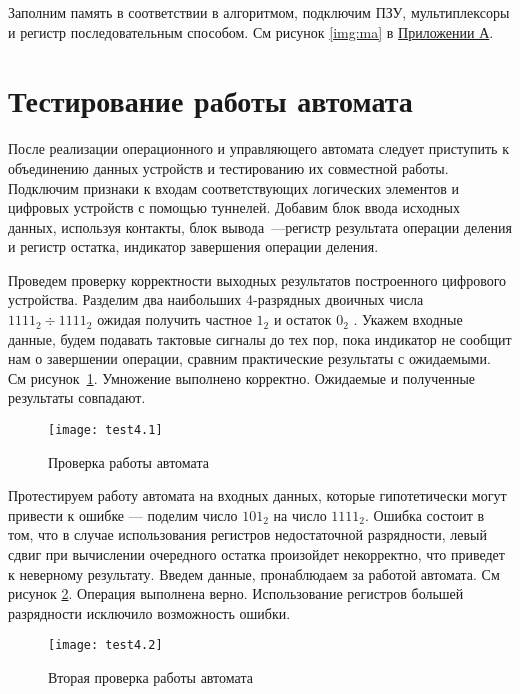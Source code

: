 \documentclass[a4paper,14pt]{extarticle}
\begin{document}
Заполним память в соответствии в алгоритмом, подключим ПЗУ, мультиплексоры и регистр последовательным способом. См рисунок \ref{img:ma} в \hyperref[tam]{Приложении А}.


\section{Тестирование работы автомата}
После реализации операционного и управляющего автомата следует приступить к объединению данных устройств и тестированию их совместной работы. Подключим признаки к входам соответствующих логических элементов и цифровых устройств с помощью туннелей. Добавим блок ввода исходных данных, используя контакты, блок вывода~---регистр результата операции деления и регистр остатка, индикатор завершения операции деления.

Проведем проверку корректности выходных результатов построенного цифрового устройства. Разделим два наибольших 4-разрядных двоичных числа $1111_2 \div 1111_2$ ожидая получить частное $1_2$ и остаток $0_2$ . Укажем входные данные, будем подавать тактовые сигналы до тех пор, пока индикатор не сообщит нам о завершении операции, сравним практические результаты с ожидаемыми. См рисунок~\ref{img:test}. Умножение выполнено корректно. Ожидаемые и полученные результаты совпадают.
\begin{figure}[h!]
	\centering
	\texttt{[image: test4.1]}
	\caption {Проверка работы автомата}
	\label{img:test}
\end{figure}

Протестируем работу автомата на входных данных, которые гипотетически могут привести к ошибке --- поделим число $101_2$ на число $1111_2$. Ошибка состоит в том, что в случае использования регистров недостаточной разрядности, левый сдвиг при вычислении очередного остатка произойдет некорректно, что приведет к неверному результату. Введем данные, пронаблюдаем за работой автомата. См рисунок \ref{img:test2}. Операция выполнена верно. Использование регистров большей разрядности исключило возможность ошибки.
\begin{figure}[h!]
	\centering
	\texttt{[image: test4.2]}
	\caption {Вторая проверка работы автомата}
	\label{img:test2}
\end{figure}
\end{document}
